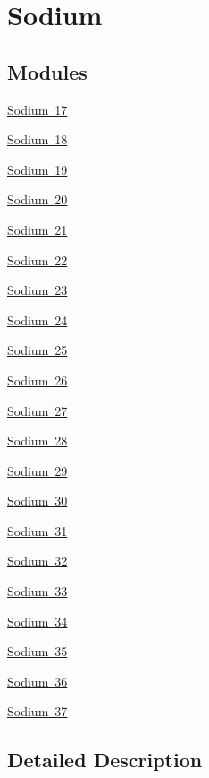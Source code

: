 \hypertarget{group___isotope_const-_sodium}{}\section{Sodium}
\label{group___isotope_const-_sodium}
\subsection*{Modules}
\begin{DoxyCompactItemize}
\item 
\mbox{\hyperlink{group___isotope_const-_sodium-_na17}{Sodium 17}}
\item 
\mbox{\hyperlink{group___isotope_const-_sodium-_na18}{Sodium 18}}
\item 
\mbox{\hyperlink{group___isotope_const-_sodium-_na19}{Sodium 19}}
\item 
\mbox{\hyperlink{group___isotope_const-_sodium-_na20}{Sodium 20}}
\item 
\mbox{\hyperlink{group___isotope_const-_sodium-_na21}{Sodium 21}}
\item 
\mbox{\hyperlink{group___isotope_const-_sodium-_na22}{Sodium 22}}
\item 
\mbox{\hyperlink{group___isotope_const-_sodium-_na23}{Sodium 23}}
\item 
\mbox{\hyperlink{group___isotope_const-_sodium-_na24}{Sodium 24}}
\item 
\mbox{\hyperlink{group___isotope_const-_sodium-_na25}{Sodium 25}}
\item 
\mbox{\hyperlink{group___isotope_const-_sodium-_na26}{Sodium 26}}
\item 
\mbox{\hyperlink{group___isotope_const-_sodium-_na27}{Sodium 27}}
\item 
\mbox{\hyperlink{group___isotope_const-_sodium-_na28}{Sodium 28}}
\item 
\mbox{\hyperlink{group___isotope_const-_sodium-_na29}{Sodium 29}}
\item 
\mbox{\hyperlink{group___isotope_const-_sodium-_na30}{Sodium 30}}
\item 
\mbox{\hyperlink{group___isotope_const-_sodium-_na31}{Sodium 31}}
\item 
\mbox{\hyperlink{group___isotope_const-_sodium-_na32}{Sodium 32}}
\item 
\mbox{\hyperlink{group___isotope_const-_sodium-_na33}{Sodium 33}}
\item 
\mbox{\hyperlink{group___isotope_const-_sodium-_na34}{Sodium 34}}
\item 
\mbox{\hyperlink{group___isotope_const-_sodium-_na35}{Sodium 35}}
\item 
\mbox{\hyperlink{group___isotope_const-_sodium-_na36}{Sodium 36}}
\item 
\mbox{\hyperlink{group___isotope_const-_sodium-_na37}{Sodium 37}}
\end{DoxyCompactItemize}


\subsection{Detailed Description}
